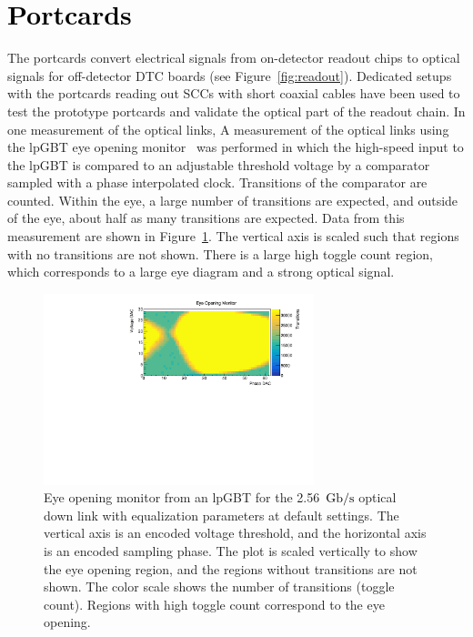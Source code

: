\documentclass[a4paper,11pt]{article}
\newcommand{\vtrxp}{VTRx+}
\newcommand{\fig}{Figure}
\newcommand{\gbps}{\ensuremath{\mathrm{Gb}/\mathrm{s}}\xspace}
\newcommand{\black}{\textcolor{black}}
\begin{document}
\section{\black{Portcards}}
\label{sec:optical}

The portcards convert electrical signals from on-detector readout chips to optical signals for off-detector DTC boards (see \fig~\ref{fig:readout}).
Dedicated setups with the portcards reading out SCCs with short coaxial cables have been used to test the prototype portcards and validate the optical part of the readout chain.
In one measurement of the optical links,
A measurement of the optical links using the lpGBT eye opening monitor~\cite{ref:lpgbt_1} was performed in which the high-speed input to the lpGBT is compared to an adjustable threshold voltage by a comparator sampled with a phase interpolated clock.
Transitions of the comparator are counted.
Within the eye, a large number of transitions are expected, and outside of the eye, about half as many transitions are expected.
Data from this measurement are shown in \fig~\ref{fig:lpgbt_eye}.
The vertical axis is scaled such that regions with no transitions are not shown.
There is a large high toggle count region, which corresponds to a large eye diagram and a strong optical signal.

%


\begin{figure}[htbp]
\centering
\includegraphics[width=0.70\textwidth,origin=c]{../figures/lpGBT_eye.pdf}
\caption{
\label{fig:lpgbt_eye}
Eye opening monitor from an lpGBT for the 2.56~\black{\gbps} optical down link with equalization parameters at default settings.
The vertical axis is an encoded voltage threshold, and the horizontal axis is an encoded sampling phase.
The plot is scaled vertically to show the eye opening region, and the regions without transitions are not shown.
The color scale shows the number of transitions (toggle count).
Regions with high toggle count correspond to the eye opening.
}
\end{figure}
\end{document}
